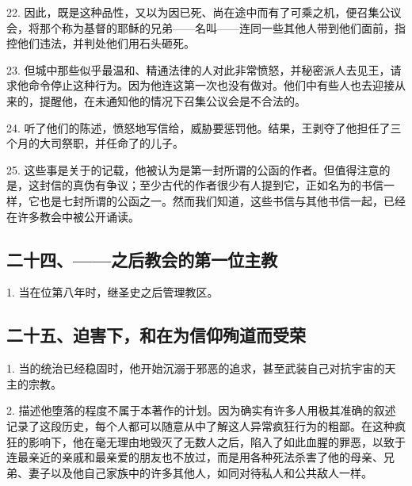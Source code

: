 22. 因此，既是这种品性，又以为因已死、尚在途中而有了可乘之机，便召集公议会，将那个称为基督的耶稣的兄弟——名叫——连同一些其他人带到他们面前，指控他们违法，并判处他们用石头砸死。\par

23. 但城中那些似乎最温和、精通法律的人对此非常愤怒，并秘密派人去见王，请求他命令停止这种行为。因为他连这第一次也没有做对。他们中有些人也去迎接从来的，提醒他，在未通知他的情况下召集公议会是不合法的。\par

24. 听了他们的陈述，愤怒地写信给，威胁要惩罚他。结果，王剥夺了他担任了三个月的大司祭职，并任命了的儿子。\par

25. 这些事是关于的记载，他被认为是第一封所谓的公函的作者。但值得注意的是，这封信的真伪有争议；至少古代的作者很少有人提到它，正如名为的书信一样，它也是七封所谓的公函之一。然而我们知道，这些书信与其他书信一起，已经在许多教会中被公开诵读。\par


\subsection{二十四、——之后教会的第一位主教}

1. 当在位第八年时，继圣史之后管理教区。\par


\subsection{二十五、迫害下，和在为信仰殉道而受荣}

1. 当的统治已经稳固时，他开始沉溺于邪恶的追求，甚至武装自己对抗宇宙的天主的宗教。\par

2. 描述他堕落的程度不属于本著作的计划。因为确实有许多人用极其准确的叙述记录了这段历史，每个人都可以随意从中了解这人异常疯狂行为的粗鄙。在这种疯狂的影响下，他在毫无理由地毁灭了无数人之后，陷入了如此血腥的罪恶，以致于连最亲近的亲戚和最亲爱的朋友也不放过，而是用各种死法杀害了他的母亲、兄弟、妻子以及他自己家族中的许多其他人，如同对待私人和公共敌人一样。\par

